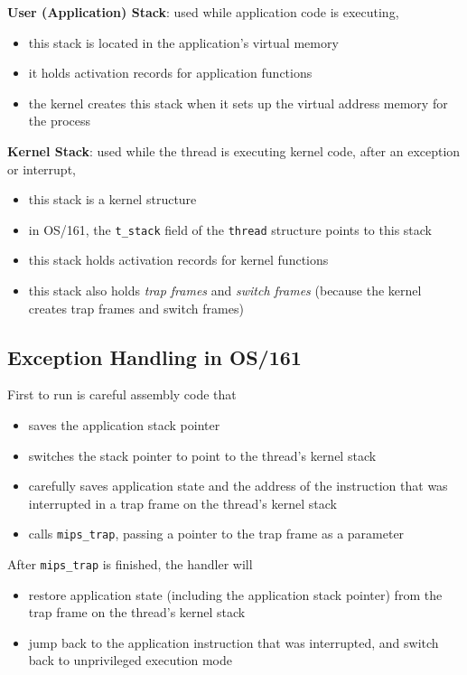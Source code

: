 \documentclass[12pt]{article}
\theoremstyle{plain}
\theoremstyle{definition}
\begin{document}
\textbf{User (Application) Stack}: used while application code is executing,
\begin{itemize}
  \item this stack is located in the application's virtual memory
  \item it holds activation records for application functions
  \item the kernel creates this stack when it sets up the virtual address memory for the process
\end{itemize}

\textbf{Kernel Stack}: used while the thread is executing kernel code, after an exception or interrupt,
\begin{itemize}
  \item this stack is a kernel structure
  \item in OS/161, the \texttt{t\_stack} field of the \texttt{thread} structure points to this stack
  \item this stack holds activation records for kernel functions
  \item this stack also holds \emph{trap frames} and \emph{switch frames} (because the kernel creates trap frames and switch frames)
\end{itemize}

\subsection{Exception Handling in OS/161}
First to run is careful assembly code that
\begin{itemize}
  \item saves the application stack pointer
  \item switches the stack pointer to point to the thread's kernel stack
  \item carefully saves application state and the address of the instruction that was interrupted in a trap frame on the thread's kernel stack
  \item calls \texttt{mips\_trap}, passing a pointer to the trap frame as a parameter
\end{itemize}

After \texttt{mips\_trap} is finished, the handler will
\begin{itemize}
  \item restore application state (including the application stack pointer) from the trap frame on the thread's kernel stack
  \item jump back to the application instruction that was interrupted, and switch back to unprivileged execution mode
\end{itemize}
\end{document}
